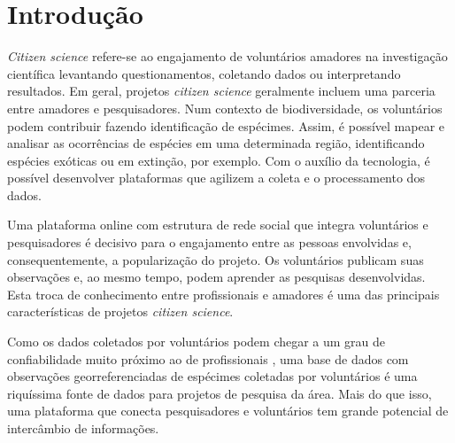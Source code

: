 \section*{Introdução}
\emph{Citizen science} refere-se ao engajamento de voluntários amadores na investigação científica levantando questionamentos, coletando dados ou interpretando resultados. Em geral, projetos \emph{citizen science} geralmente incluem uma parceria entre amadores e pesquisadores. \cite{sivertown2009} Num contexto de biodiversidade, os voluntários podem contribuir fazendo identificação de espécimes. Assim, é possível mapear e analisar as ocorrências de espécies em uma determinada região, identificando espécies exóticas ou em extinção, por exemplo. \cite{miller2012} Com o auxílio da tecnologia, é possível desenvolver plataformas que agilizem a coleta e o processamento dos dados. \cite{bonney2014}

Uma plataforma online com estrutura de rede social que integra voluntários e pesquisadores é decisivo para o engajamento entre as pessoas envolvidas e, consequentemente, a popularização do projeto. Os voluntários publicam suas observações e, ao mesmo tempo, podem aprender as pesquisas desenvolvidas. Esta troca de conhecimento entre profissionais e amadores é uma das principais características de projetos \emph{citizen science}. \cite{sivertown2009}

Como os dados coletados por voluntários podem chegar a um grau de confiabilidade muito próximo ao de profissionais \cite{gollan2012, vanstrien2013}, uma base de dados com observações georreferenciadas de espécimes coletadas por voluntários é uma riquíssima fonte de dados para projetos de pesquisa da área. Mais do que isso, uma plataforma que conecta pesquisadores e voluntários tem grande potencial de intercâmbio de informações. 
